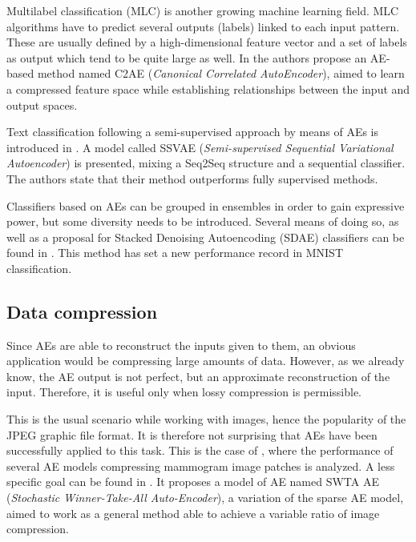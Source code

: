 Multilabel classification \cite{Charte:SB-MLC} (MLC) is another growing machine learning field. MLC algorithms have to predict several outputs (labels) linked to each input pattern. These are usually defined by a high-dimensional feature vector and a set of labels as output which tend to be quite large as well. In \cite{MLC-DL} the authors propose an AE-based method named C2AE (\textit{Canonical Correlated AutoEncoder}), aimed to learn a compressed feature space while establishing relationships between the input and output spaces.

Text classification following a semi-supervised approach by means of AEs is introduced in \cite{Xu2017VariationalAF}. A model called SSVAE (\textit{Semi-supervised Sequential Variational Autoencoder}) is presented, mixing a Seq2Seq \cite{Seq2Seq} structure and a sequential classifier. The authors state that their method outperforms fully supervised methods.

Classifiers based on AEs can be grouped in ensembles in order to gain expressive power, but some diversity needs to be introduced. Several means of doing so, as well as a proposal for Stacked Denoising Autoencoding (SDAE) classifiers can be found in \cite{Alvear_Sandoval_2018}. This method has set a new performance record in MNIST classification.


\subsection{Data compression}
Since AEs are able to reconstruct the inputs given to them, an obvious application would be compressing large amounts of data. However, as we already know, the AE output is not perfect, but an approximate reconstruction of the input. Therefore, it is useful only when lossy compression is permissible. 

This is the usual scenario while working with images, hence the popularity of the JPEG \cite{JPEG} graphic file format. It is therefore not surprising that AEs have been successfully applied to this task. This is the case of \cite{tan_using_2011}, where the performance of several AE models compressing mammogram image patches is analyzed. A less specific goal can be found in \cite{AEImageCompress}. It proposes a model of AE named SWTA AE (\textit{Stochastic Winner-Take-All Auto-Encoder}), a variation of the sparse AE model, aimed to work as a general method able to achieve a variable ratio of image compression.

